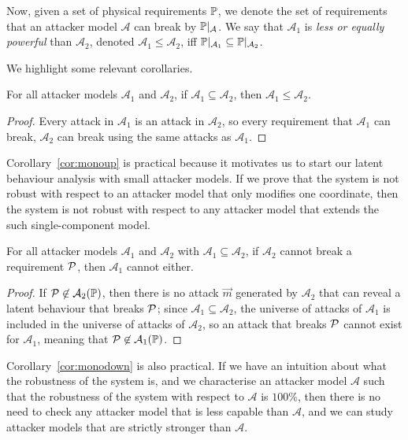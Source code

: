 {{\begin{definition}[Capabilities and Power]
  Now, given a set of physical requirements $\mathbb{P}$, we denote the set of requirements that an attacker model $\mathcal{A}$ can break by $\mathbb{P}|_{\mathcal{A}}$. We say that $\mathcal{A}_1$ is \emph{less or equally {powerful}} than $\mathcal{A}_2$, denoted $\mathcal{A}_1\leq \mathcal{A}_2$, iff $\mathbb{P}|_{\mathcal{A}_1}\subseteq\mathbb{P}|_{\mathcal{A}_2}$. 
\end{definition}
We highlight some relevant corollaries.
\begin{corollary}
  \label{cor:monoup}
  For all attacker models $\mathcal{A}_1$ and $\mathcal{A}_2$, if $\mathcal{A}_1\subseteq \mathcal{A}_2$, then $\mathcal{A}_1 \leq \mathcal{A}_2$. 
\end{corollary}
\begin{proof}
  Every attack in $\mathcal{A}_1$ is an attack in $\mathcal{A}_2$, so every requirement that $\mathcal{A}_1$ can break, $\mathcal{A}_2$ can break using the same attacks as $\mathcal{A}_1$.
\end{proof}
Corollary~\ref{cor:monoup} is practical because it motivates us to start our latent behaviour analysis with small attacker models. If we prove that the system is not robust with respect to an attacker model that only modifies one coordinate, then the system is not robust with respect to any attacker model that extends the such single-component model.

\begin{corollary}
  \label{cor:monodown}
  For all attacker models $\mathcal{A}_1$ and $\mathcal{A}_2$ with $\mathcal{A}_1\subseteq \mathcal{A}_2$, if $\mathcal{A}_2$ cannot break a requirement $\mathcal{P}$, then $\mathcal{A}_1$ cannot either.
  \end{corollary}
  \begin{proof}
  If $\mathcal{P}\not\in\mathcal{A}_2(\mathbb{P})$, then there is no attack $\vec{m}$ generated by $\mathcal{A}_2$ that can reveal a latent behaviour that breaks $\mathcal{P}$; since $\mathcal{A}_1\subseteq \mathcal{A}_2$, the universe of attacks of $\mathcal{A}_1$ is included in the universe of attacks of $\mathcal{A}_2$, so an attack that breaks $\mathcal{P}$ cannot exist for $\mathcal{A}_1$, meaning that $\mathcal{P}\not\in\mathcal{A}_1(\mathbb{P})$.
  \end{proof}
  Corollary~\ref{cor:monodown} is also practical. If we have an intuition about what the robustness of the system is, and we characterise an attacker model $\mathcal{A}$ such that the robustness of the system with respect to $\mathcal{A}$ is $100\%$, then there is no need to check any attacker model that is less capable than $\mathcal{A}$, and we can study attacker models that are strictly stronger than $\mathcal{A}$.

}}
